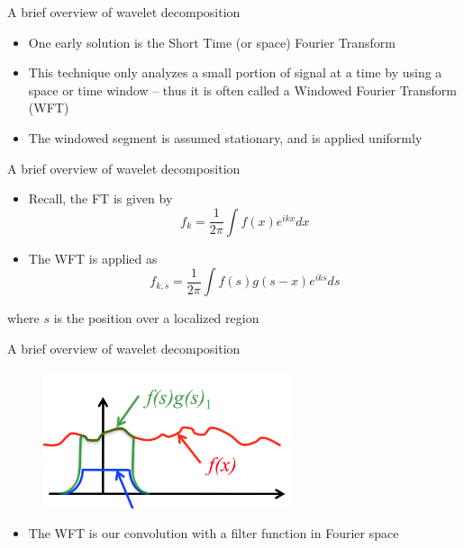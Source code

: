 
\begin{frame}{A brief overview of wavelet decomposition}

\begin{itemize}
	\item One early solution is the Short Time (or space) Fourier Transform
\item This technique only analyzes a small portion of signal at a time by using a space or time window -- thus it is often called a Windowed Fourier Transform (WFT)
\item The windowed segment is assumed stationary, and is applied uniformly
\end{itemize}

\end{frame}


\begin{frame}{A brief overview of wavelet decomposition}
\begin{itemize}
\item Recall, the FT is given by
$$f_k = \frac{1}{2\pi} \int f(x) e^{ikx} dx$$
\item The WFT is applied as
$$f_{k,s} = \frac{1}{2\pi} \int f(s) g(s-x) e^{iks} ds$$
\end{itemize}
where $s$ is the position over a localized region
\end{frame}


\begin{frame}{A brief overview of wavelet decomposition}
\begin{figure}
	\includegraphics[width=0.65\textwidth]{wavelet1}
\end{figure}
\begin{itemize}
	\item The WFT is our convolution with a filter function in Fourier space
\end{itemize}
\end{frame}

